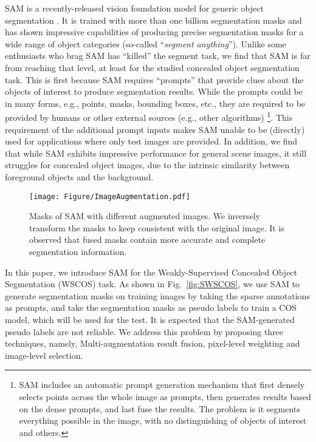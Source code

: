 SAM is a recently-released vision foundation model for generic object segmentation \cite{kirillov2023segment}. It is trained with more than one billion segmentation masks and has shown impressive capabilities of producing precise segmentation masks for a wide range of object categories (so-called ``\emph{segment anything}''). 
Unlike some enthusiasts who brag SAM has ``killed'' the segment task, we find that SAM is far from reaching that level, at least for the studied concealed object segmentation task. This is first because SAM requires ``prompts'' that provide clues about the objects of interest to produce segmentation results. While the prompts could be in many forms, e.g., points, masks, bounding boxes, etc., they are required to be provided by humans or other external sources (e.g., other algorithms) \footnote{SAM includes an automatic prompt generation mechanism that first densely selects points across the whole image as prompts, then generates results based on the dense prompts, and last fuse the results. The problem is it segments everything possible in the image, with no distinguishing of objects of interest and others.}.  This requirement of the additional prompt inputs makes SAM unable to be (directly) used for applications where only test images are provided.  In addition, we find that while SAM exhibits impressive performance for general scene images, it still struggles for concealed object images, due to the intrinsic similarity between foreground objects and the background. 

\begin{figure}[t]
	\centering
	\setlength{\abovecaptionskip}{-0.2cm}
	\begin{center}
		\texttt{[image: Figure/ImageAugmentation.pdf]}
	\end{center}
	\caption{Masks of SAM with different augmented images. We inversely transform the masks to keep consistent with the original image. It is observed that fused masks contain more accurate and complete segmentation information.
 }
	\label{fig:Augmentation}
	\vspace{-0.6cm}
\end{figure}

In this paper, we introduce SAM for the Weakly-Supervised Concealed Object Segmentation (WSCOS) task. As shown in Fig.~\ref{fig:SWSCOS}, we use SAM to generate segmentation masks on training images by taking the sparse annotations as prompts, and take the segmentation masks as pseudo labels to train a COS model, which will be used for the test. 
It is expected that the SAM-generated pseudo labels are not reliable. We address this problem by proposing three techniques, namely, Multi-augmentation result fusion, pixel-level weighting and image-level selection. 

